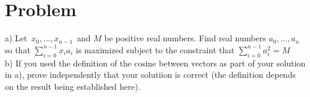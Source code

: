 \documentclass[11pt,a4paper]{report}
\theoremstyle{plain}
\theoremstyle{definition}
\theoremstyle{remark}
\begin{document}
\section*{Problem}
a)  Let $x_0 , ... , x_{n-1}$ and $M$ be positive real numbers.  Find real numbers $a_0, ..., a_n$ so that $\sum_{i = 0}^{n-1} x_i a_i$ is maximized subject to the constraint that $\sum_{i = 0}^{n-1} a_i ^2 = M$
\\
b) If you used the definition of the cosine between vectors as part of your solution in a), prove independently that your solutiion is correct (the definition depends on the result being established here).
\end{document}
